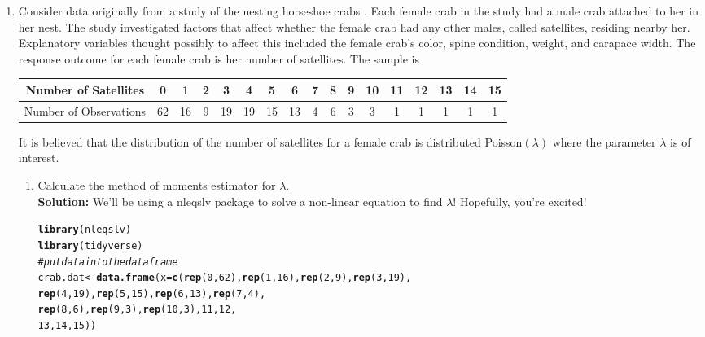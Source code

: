 \documentclass{article}\usepackage[]{graphicx}\usepackage[]{color}
\makeatletter
\newcommand{\hlnum}[1]{\textcolor[rgb]{0.686,0.059,0.569}{#1}}%
\newcommand{\hlcom}[1]{\textcolor[rgb]{0.678,0.584,0.686}{\textit{#1}}}%
\newcommand{\hlstd}[1]{\textcolor[rgb]{0.345,0.345,0.345}{#1}}%
\newcommand{\hlkwb}[1]{\textcolor[rgb]{0.69,0.353,0.396}{#1}}%
\newcommand{\hlkwc}[1]{\textcolor[rgb]{0.333,0.667,0.333}{#1}}%
\newcommand{\hlkwd}[1]{\textcolor[rgb]{0.737,0.353,0.396}{\textbf{#1}}}%
\newenvironment{kframe}{%
 \def\at@end@of@kframe{}%
 \ifinner\ifhmode%
  \def\at@end@of@kframe{\end{minipage}}%
  \begin{minipage}{\columnwidth}%
 \fi\fi%
 \def\FrameCommand##1{\hskip\@totalleftmargin \hskip-\fboxsep
 \colorbox{shadecolor}{##1}\hskip-\fboxsep
     \hskip-\linewidth \hskip-\@totalleftmargin \hskip\columnwidth}%
 \MakeFramed {\advance\hsize-\width
   \@totalleftmargin\z@ \linewidth\hsize
   \@setminipage}}%
 {\par\unskip\endMakeFramed%
 \at@end@of@kframe}
\newenvironment{knitrout}{}{} %
\makeatother
\begin{document}
\begin{enumerate}
\item Consider  data originally from a study of the nesting horseshoe crabs 
\citep{Brockmann96}. Each female crab in the study had a male crab attached to 
her in her nest. The study investigated factors that affect whether the female 
crab had any other males, called satellites, residing nearby her. Explanatory 
variables thought possibly to affect this included the female crab's color, 
spine condition, weight, and carapace width. The response outcome for each 
female crab is her number of satellites.
	 The sample is
	\begin{center}
		\begin{tabular}{|ccccccccccccccccc|}\hline
		 Number of Satellites& 0 & 1&  2&  3&  4&  5&  6&  7&  8&  9& 10& 11& 12& 13 &14& 15\\ \hline
		 Number of Observations&62& 16&  9& 19& 19& 15& 13&  4&  6&  3&  3&  1&  1&  1&  1&1\\\hline
 		\end{tabular}
	\end{center}
 	It is believed that the distribution of the number of satellites for a female 
 	crab is distributed Poisson$(\lambda)$ where the parameter $\lambda$ is of interest.
	\begin{enumerate}
	\item Calculate the method of moments estimator for $\lambda$.\\
	\textbf{Solution:} We'll be using a nleqslv package \cite{nlesqlv} to solve a non-linear equation to find $\lambda$! Hopefully, you're excited!
\begin{knitrout}
\color{fgcolor}\begin{kframe}
\begin{alltt}
\hlkwd{library}\hlstd{(nleqslv)}
\hlkwd{library}\hlstd{(tidyverse)}
\hlcom{#put data into the dataframe}
\hlstd{crab.dat} \hlkwb{<-} \hlkwd{data.frame}\hlstd{(}\hlkwc{x}\hlstd{=}\hlkwd{c}\hlstd{(}\hlkwd{rep}\hlstd{(}\hlnum{0}\hlstd{,}\hlnum{62}\hlstd{),} \hlkwd{rep}\hlstd{(}\hlnum{1}\hlstd{,} \hlnum{16}\hlstd{),} \hlkwd{rep}\hlstd{(}\hlnum{2}\hlstd{,} \hlnum{9}\hlstd{),} \hlkwd{rep}\hlstd{(}\hlnum{3}\hlstd{,} \hlnum{19}\hlstd{),}
                           \hlkwd{rep}\hlstd{(}\hlnum{4}\hlstd{,} \hlnum{19}\hlstd{),} \hlkwd{rep}\hlstd{(}\hlnum{5}\hlstd{,} \hlnum{15}\hlstd{),} \hlkwd{rep}\hlstd{(}\hlnum{6}\hlstd{,} \hlnum{13}\hlstd{),} \hlkwd{rep}\hlstd{(}\hlnum{7}\hlstd{,} \hlnum{4}\hlstd{),}
                           \hlkwd{rep}\hlstd{(}\hlnum{8}\hlstd{,} \hlnum{6}\hlstd{),} \hlkwd{rep}\hlstd{(}\hlnum{9}\hlstd{,} \hlnum{3}\hlstd{),} \hlkwd{rep}\hlstd{(}\hlnum{10}\hlstd{,} \hlnum{3}\hlstd{),} \hlnum{11}\hlstd{,} \hlnum{12}\hlstd{,}
                           \hlnum{13}\hlstd{,} \hlnum{14}\hlstd{,} \hlnum{15}\hlstd{))}




\end{alltt}
\end{kframe}
\end{knitrout}
\end{enumerate}
\end{enumerate}
\end{document}
